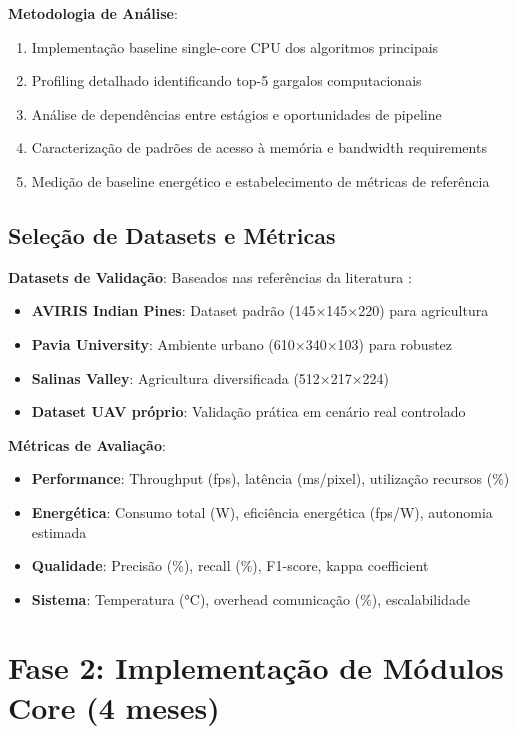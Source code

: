 \textbf{Metodologia de Análise}:
\begin{enumerate}
\item Implementação baseline single-core CPU dos algoritmos principais
\item Profiling detalhado identificando top-5 gargalos computacionais
\item Análise de dependências entre estágios e oportunidades de pipeline
\item Caracterização de padrões de acesso à memória e bandwidth requirements
\item Medição de baseline energético e estabelecimento de métricas de referência
\end{enumerate}

\subsection{Seleção de Datasets e Métricas}

\textbf{Datasets de Validação}:
Baseados nas referências da literatura \cite{lou2024, ullah2020}:
\begin{itemize}
\item \textbf{AVIRIS Indian Pines}: Dataset padrão (145×145×220) para agricultura
\item \textbf{Pavia University}: Ambiente urbano (610×340×103) para robustez
\item \textbf{Salinas Valley}: Agricultura diversificada (512×217×224)
\item \textbf{Dataset UAV próprio}: Validação prática em cenário real controlado
\end{itemize}

\textbf{Métricas de Avaliação}:
\begin{itemize}
\item \textbf{Performance}: Throughput (fps), latência (ms/pixel), utilização recursos (\%)
\item \textbf{Energética}: Consumo total (W), eficiência energética (fps/W), autonomia estimada
\item \textbf{Qualidade}: Precisão (\%), recall (\%), F1-score, kappa coefficient
\item \textbf{Sistema}: Temperatura (°C), overhead comunicação (\%), escalabilidade
\end{itemize}

\section{Fase 2: Implementação de Módulos Core (4 meses)}

